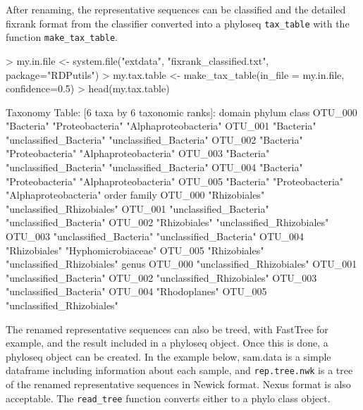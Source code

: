 \documentclass{article}
\begin{document}
After renaming, the representative sequences can be classified and the detailed fixrank format from the classifier converted into a phyloseq \texttt{tax\_table} with the function \texttt{make\_tax\_table}.
\begin{Schunk}
\begin{Sinput}
> my.in.file <- system.file("extdata", "fixrank_classified.txt", package="RDPutils")
> my.tax.table <- make_tax_table(in_file = my.in.file, confidence=0.5)
> head(my.tax.table)
\end{Sinput}
\begin{Soutput}
Taxonomy Table:     [6 taxa by 6 taxonomic ranks]:
        domain     phylum                  class                  
OTU_000 "Bacteria" "Proteobacteria"        "Alphaproteobacteria"  
OTU_001 "Bacteria" "unclassified_Bacteria" "unclassified_Bacteria"
OTU_002 "Bacteria" "Proteobacteria"        "Alphaproteobacteria"  
OTU_003 "Bacteria" "unclassified_Bacteria" "unclassified_Bacteria"
OTU_004 "Bacteria" "Proteobacteria"        "Alphaproteobacteria"  
OTU_005 "Bacteria" "Proteobacteria"        "Alphaproteobacteria"  
        order                   family                    
OTU_000 "Rhizobiales"           "unclassified_Rhizobiales"
OTU_001 "unclassified_Bacteria" "unclassified_Bacteria"   
OTU_002 "Rhizobiales"           "unclassified_Rhizobiales"
OTU_003 "unclassified_Bacteria" "unclassified_Bacteria"   
OTU_004 "Rhizobiales"           "Hyphomicrobiaceae"       
OTU_005 "Rhizobiales"           "unclassified_Rhizobiales"
        genus                     
OTU_000 "unclassified_Rhizobiales"
OTU_001 "unclassified_Bacteria"   
OTU_002 "unclassified_Rhizobiales"
OTU_003 "unclassified_Bacteria"   
OTU_004 "Rhodoplanes"             
OTU_005 "unclassified_Rhizobiales"
\end{Soutput}
\end{Schunk}
The renamed representative sequences can also be treed, with FastTree for example, and the result included in a phyloseq object.  Once this is done, a phyloseq object can be created.  In the example below, sam.data is a simple dataframe including information about each sample, and \texttt{rep.tree.nwk} is a tree of the renamed representative sequences in Newick format.  Nexus format is also acceptable.  The \texttt{read\_tree} function converts either to a phylo class object.
\end{document}
